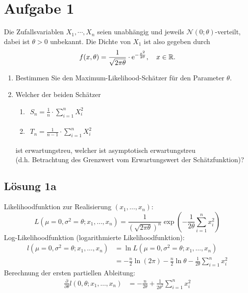 \documentclass[main.tex]{subfiles}
\begin{document}
\section{Aufgabe 1}
Die Zufallsvariablen $X_1, \cdots, X_n$ seien unabhängig und jeweils $\mathcal{N}(0; \theta)$-verteilt, dabei ist $\theta > 0$ unbekannt. Die Dichte von $X_1$ ist also gegeben durch
$$
f(x, \theta)
= \frac{1}{\sqrt{2 \pi \theta}} \cdot \operatorname{\mathrm{e}}^{-\frac{x^2}{2 \theta}},
\quad x\in \mathbb{R}.
$$
\begin{enumerate}
\item Bestimmen Sie den Maximum-Likelihood-Schätzer für den Parameter $\theta$.
\item Welcher der beiden Schätzer
\begin{enumerate}
  	\item $\begin{aligned} S_n = \frac{1}{n} \cdot \sum \limits_{i=1}^{n} X_i^2 \end{aligned}$
  	\item $\begin{aligned} T_n = \frac{1}{n-1} \cdot \sum \limits_{i=1}^{n} X_i^2 \end{aligned}$
\end{enumerate}
 ist erwartungstreu, welcher ist asymptotisch erwartungstreu \\
 (d.h. Betrachtung des Grenzwert vom Erwartungswert der Schätzfunktion)?
\end{enumerate}

\subsection{Lösung 1a}
Likelihoodfunktion zur Realisierung $(x_1, \ldots, x_n)$:
$$
	L(\mu{=}0, \sigma^2{=}\theta ; x_1, \ldots, x_n) = \frac{1}{\left(\sqrt{2\pi\theta}\right)^n} \exp\left( -\frac{1}{2\theta} \sum^n_{i=1}x_i^2 \right)
$$
Log-Likelihoodfunktion (logarithmierte Likelihoodfunktion):
$$\begin{aligned}
	l(\mu{=}0, \sigma^2{=}\theta ; x_1, \ldots, x_n) &= \ln L(\mu{=}0, \sigma^2{=}\theta ; x_1, \ldots, x_n) \\
	&= -\frac{n}{2} \ln(2\pi) - \frac{n}{2}\ln \theta - \frac{1}{2\theta} \sum^n_{i=1}x_i^2
\end{aligned}$$
Berechnung der ersten partiellen Ableitung:
$$\begin{aligned}
	\frac{\partial}{\partial \theta} l(0, \theta ; x_1, \ldots, x_n)
	&= - \frac{n}{2\theta} + \frac{1}{2\theta^2} \sum^n_{i=1}x_i^2
\end{aligned}$$
\end{document}
